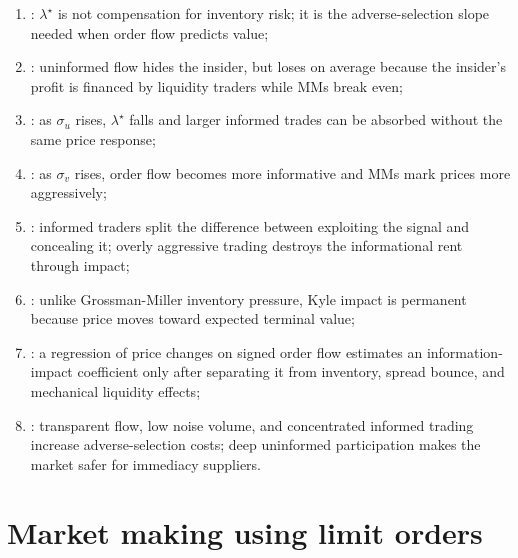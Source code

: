\documentclass[a4paper,oneside,openany]{book}
\begin{document}
\begin{model}
\par\smallskip\noindent{}
\begin{enumerate}[label=\roman*.]
\setlength{\itemsep}{0pt}
\item {}: $\lambda^\star$ is not compensation for inventory risk; it is the adverse-selection slope needed when order flow predicts value;
\item {}: uninformed flow hides the insider, but loses on average because the insider's profit is financed by liquidity traders while MMs break even;
\item {}: as $\sigma_u$ rises, $\lambda^\star$ falls and larger informed trades can be absorbed without the same price response;
\item {}: as $\sigma_v$ rises, order flow becomes more informative and MMs mark prices more aggressively;
\item {}: informed traders split the difference between exploiting the signal and concealing it; overly aggressive trading destroys the informational rent through impact;
\item {}: unlike Grossman-Miller inventory pressure, Kyle impact is permanent because price moves toward expected terminal value;
\item {}: a regression of price changes on signed order flow estimates an information-impact coefficient only after separating it from inventory, spread bounce, and mechanical liquidity effects;
\item {}: transparent flow, low noise volume, and concentrated informed trading increase adverse-selection costs; deep uninformed participation makes the market safer for immediacy suppliers.
\end{enumerate}
\end{model}

\section*{Market making using limit orders}
\end{document}

